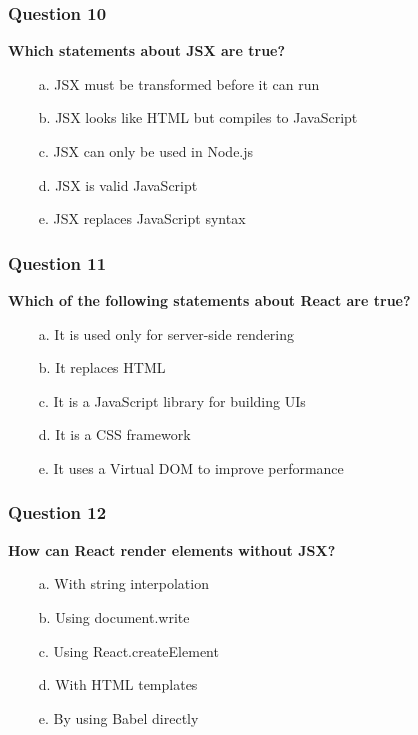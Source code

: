 \documentclass{article}
\newcommand{\cmark}{\textcolor{green}{\ding{51}}} %
\newcommand{\xmark}{\textcolor{red}{\ding{55}}}   %
\begin{document}
\subsubsection*{Question 10}
\textbf{Which statements about JSX are true?}

\begin{itemize}
  \item[\cmark\ a.] JSX must be transformed before it can run
  \item[\cmark\ b.] JSX looks like HTML but compiles to JavaScript
  \item[\xmark\ c.] JSX can only be used in Node.js
  \item[\xmark\ d.] JSX is valid JavaScript
  \item[\xmark\ e.] JSX replaces JavaScript syntax
\end{itemize}

\subsubsection*{Question 11}
\textbf{Which of the following statements about React are true?}

\begin{itemize}
  \item[\xmark\ a.] It is used only for server-side rendering
  \item[\cmark\ b.] It replaces HTML
  \item[\xmark\ c.] It is a JavaScript library for building UIs
  \item[\xmark\ d.] It is a CSS framework
  \item[\cmark\ e.] It uses a Virtual DOM to improve performance
\end{itemize}

\subsubsection*{Question 12}
\textbf{How can React render elements without JSX?}

\begin{itemize}
  \item[\xmark\ a.] With string interpolation
  \item[\xmark\ b.] Using document.write
  \item[\cmark\ c.] Using React.createElement
  \item[\xmark\ d.] With HTML templates
  \item[\xmark\ e.] By using Babel directly
\end{itemize}
\end{document}
